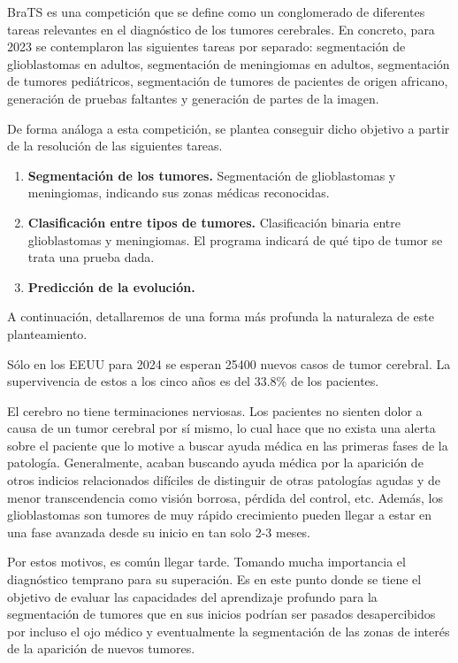 BraTS es una competición que se define como un conglomerado de diferentes tareas relevantes en el diagnóstico de los tumores cerebrales. En concreto, para 2023 se contemplaron las siguientes tareas por separado: segmentación de glioblastomas en adultos, segmentación de meningiomas en adultos, segmentación de tumores pediátricos, segmentación de tumores de pacientes de origen africano, generación de pruebas faltantes y generación de partes de la imagen.

De forma análoga a esta competición, se plantea conseguir dicho objetivo a partir de la resolución de las siguientes tareas.

\begin{enumerate}
	\item \textbf{Segmentación de los tumores.} 
	Segmentación de glioblastomas y meningiomas, indicando sus zonas médicas reconocidas.
	\item \textbf{Clasificación entre tipos de tumores.} Clasificación binaria entre glioblastomas y meningiomas. El programa indicará de qué tipo de tumor se trata una prueba dada.
	\item \textbf{Predicción de la evolución.} 
\end{enumerate}

A continuación, detallaremos de una forma más profunda la naturaleza de este planteamiento.

Sólo en los EEUU para 2024 se esperan 25400 nuevos casos de tumor cerebral. La supervivencia de estos a los cinco años es del $33.8 \%$ de los pacientes. \cite{cancerorg}

El cerebro no tiene terminaciones nerviosas. Los pacientes no sienten dolor a causa de un tumor cerebral por sí mismo, lo cual hace que no exista una alerta sobre el paciente que lo motive a buscar ayuda médica en las primeras fases de la patología. Generalmente, acaban buscando ayuda médica por la aparición de otros indicios relacionados difíciles de distinguir de otras patologías agudas y de menor transcendencia como visión borrosa, pérdida del control, etc. Además, los glioblastomas son tumores de muy rápido crecimiento pueden llegar a estar en una fase avanzada desde su inicio en tan solo 2-3 meses.

Por estos motivos, es común llegar tarde. Tomando mucha importancia el diagnóstico temprano para su superación. Es en este punto donde se tiene el objetivo de evaluar las capacidades del aprendizaje profundo para la segmentación de tumores que en sus inicios podrían ser pasados desapercibidos por incluso el ojo médico y eventualmente la segmentación de las zonas de interés de la aparición de nuevos tumores.

